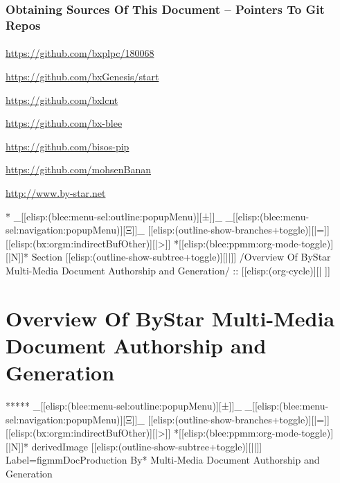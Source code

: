 \begin{whenOrg}
\begin{frame}[fragile,plain,label=obtainingSources]
    \frametitle{Obtaining Sources Of This Document -- Pointers To Git Repos}
    \framesubtitle{}

    \url{https://github.com/bxplpc/180068}

    \bigskip

    \url{https://github.com/bxGenesis/start}

    \url{https://github.com/bxlcnt}

    \url{https://github.com/bx-blee}

    \url{https://github.com/bisos-pip}

    \bigskip

    \url{https://github.com/mohsenBanan}

    \url{http://www.by-star.net}



\end{frame}


\begin{whenOrg}
*  _[[elisp:(blee:menu-sel:outline:popupMenu)][±]]_ _[[elisp:(blee:menu-sel:navigation:popupMenu)][Ξ]]_ [[elisp:(outline-show-branches+toggle)][|=]] [[elisp:(bx:orgm:indirectBufOther)][|>]] *[[elisp:(blee:ppmm:org-mode-toggle)][|N]]*  Section    [[elisp:(outline-show-subtree+toggle)][||]]   /Overview Of ByStar Multi-Media Document Authorship and Generation/ ::  [[elisp:(org-cycle)][| ]]
\end{whenOrg}

\section{Overview Of ByStar Multi-Media Document Authorship and Generation}


\begin{whenOrg}
*****  _[[elisp:(blee:menu-sel:outline:popupMenu)][±]]_ _[[elisp:(blee:menu-sel:navigation:popupMenu)][Ξ]]_ [[elisp:(outline-show-branches+toggle)][|=]] [[elisp:(bx:orgm:indirectBufOther)][|>]] *[[elisp:(blee:ppmm:org-mode-toggle)][|N]]*  derivedImage [[elisp:(outline-show-subtree+toggle)][||]] Label=figmmDocProduction By* Multi-Media Document Authorship and Generation
\end{whenOrg}


\end{whenOrg}

